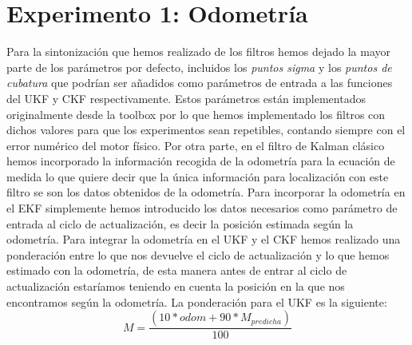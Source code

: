 \section{Experimento 1: Odometría}
Para la sintonización que hemos realizado de los filtros hemos dejado la mayor parte de los parámetros por defecto, incluidos los \textit{puntos sigma} y los \textit{puntos de cubatura} que podrían ser añadidos como parámetros de entrada a las funciones del \ac{UKF} y \ac{CKF} respectivamente.
Estos parámetros están implementados originalmente desde la toolbox \cite{toolbox_simo} por lo que hemos implementado los filtros con dichos valores para que los experimentos sean repetibles, contando siempre con el error numérico del motor físico.
%
%
%
%
%
Por otra parte, en el filtro de Kalman clásico hemos incorporado la información recogida de la odometría para la ecuación de medida lo que quiere decir que la única información para localización con este filtro se son los datos obtenidos de la odometría.
Para incorporar la odometría en el \ac{EKF} simplemente hemos introducido los datos necesarios como parámetro de entrada al ciclo de actualización, es decir la posición estimada según la odometría.
Para integrar la odometría en el \ac{UKF} y el \ac{CKF} hemos realizado una ponderación entre lo que nos devuelve el ciclo de actualización y lo que hemos estimado con la odometría, de esta manera antes de entrar al ciclo de actualización estaríamos teniendo en cuenta la posición en la que nos encontramos según la odometría.
La ponderación para el \ac{UKF} es la siguiente:
\begin{equation}\label{Ec:Ponderacion_UKF}
M = \frac{(10*odom+90*M_{predicha})}{100}
\end{equation}
